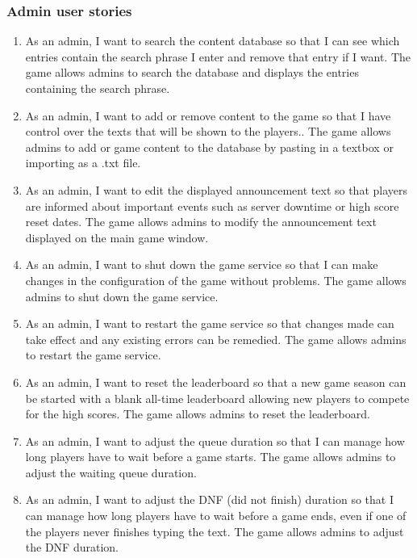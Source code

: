 \documentclass{article}
\begin{document}
\subsubsection{Admin user stories}

\begin{enumerate}
	\item
	      As an admin, I want to search the content database so that I can see which entries contain the search phrase I enter and remove that entry if I want.
	      \subitem
	      The game allows admins to search the database and displays the entries containing the search phrase.

	\item
	      As an admin, I want to add or remove content to the game so that I have control over the texts that will be shown to the players..
	      \subitem
	      The game allows admins to add or game content to the database by pasting in a textbox or importing as a .txt file.

	\item
	      As an admin, I want to edit the displayed announcement text so that players are informed about important events such as server downtime or high score reset dates.
	      \subitem
	      The game allows admins to modify the announcement text displayed on the main game window.

	\item
	      As an admin, I want to shut down the game service so that I can make changes in the configuration of the game without problems.
	      \subitem
	      The game allows admins to shut down the game service.

	\item
	      As an admin, I want to restart the game service so that changes made can take effect and any existing errors can be remedied.
	      \subitem
	      The game allows admins to restart the game service.

	\item
	      As an admin, I want to reset the leaderboard so that a new game season can be started with a blank all-time leaderboard allowing new players to compete for the high scores.
	      \subitem
	      The game allows admins to reset the leaderboard.

	\item
	      As an admin, I want to adjust the queue duration so that I can manage how long players have to wait before a game starts.
	      \subitem
	      The game allows admins to adjust the waiting queue duration.

	\item
	      As an admin, I want to adjust the DNF (did not finish) duration so that I can manage how long players have to wait before a game ends, even if one of the players never finishes typing the text.
	      \subitem
	      The game allows admins to adjust the DNF duration.
\end{enumerate}
\end{document}
